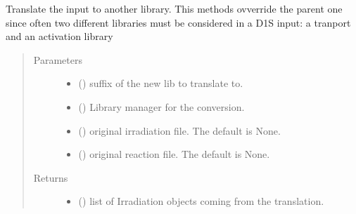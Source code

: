 \documentclass[letterpaper,10pt,english]{sphinxmanual}
\begin{document}
\begin{fulllineitems}

\begin{fulllineitems}
\label{\detokenize{api/inputgeneration:inputfile.D1S_Input.translate}}
Translate the input to another library. This methods ovverride the
parent one since often two different libraries must be considered in
a D1S input: a tranport and an activation library
\begin{quote}\begin{description}
\item[{Parameters}] \leavevmode\begin{itemize}
\item {} 
 () \textendash{} suffix of the new lib to translate to.

\item {} 
 ({\hyperref[\detokenize{api/initobjects:libmanager.LibManager}]{}}) \textendash{} Library manager for the conversion.

\item {} 
 (\sphinxstyleliteralemphasis{\sphinxupquote{, }}) \textendash{} original irradiation file. The default is None.

\item {} 
 (\sphinxstyleliteralemphasis{\sphinxupquote{, }}) \textendash{} original reaction file. The default is None.

\end{itemize}

\item[{Returns}] \leavevmode
\begin{itemize}
\item {} 
 () \textendash{} list of Irradiation objects coming from the translation.


\end{itemize}
\end{description}
\end{quote}
\end{fulllineitems}
\end{fulllineitems}
\end{document}
